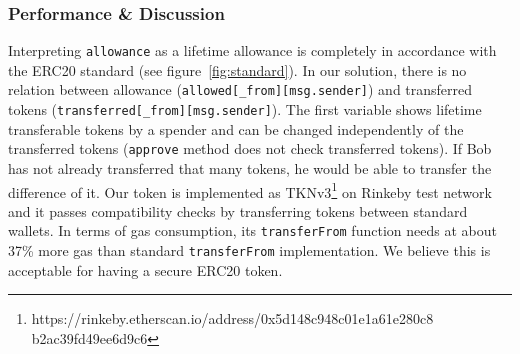 \subsubsection*{Performance \& Discussion} Interpreting \texttt{allowance} as a lifetime allowance is completely in accordance with the ERC20 standard (see figure~\ref{fig:standard}). In our solution, there is no relation between allowance (\texttt{allowed[\_from][msg.sender]}) and transferred tokens (\texttt{transferred[\_from][msg.sender]}). The first variable shows lifetime transferable tokens by a spender and can be changed independently of the transferred tokens (\ie \texttt{approve} method does not check transferred tokens). If Bob has not already transferred that many tokens, he would be able to transfer the difference of it. Our token is implemented as TKNv3\footnote{https://rinkeby.etherscan.io/address/0x5d148c948c01e1a61e280c8 b2ac39fd49ee6d9c6} on Rinkeby test network and it passes compatibility checks by transferring tokens between standard wallets. In terms of gas consumption, its \texttt{transferFrom} function needs at about 37\% more gas than standard \texttt{transferFrom} implementation. We believe this is acceptable for having a secure ERC20 token.

